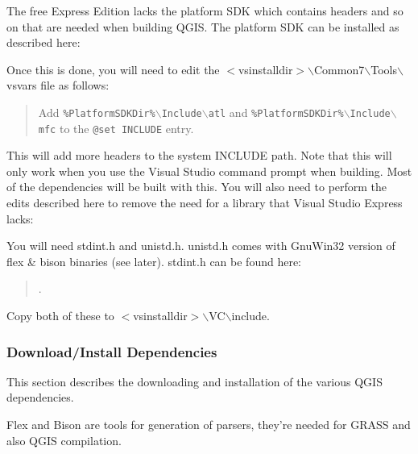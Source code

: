 The free Express Edition lacks the platform SDK which contains headers and so on that are needed when building QGIS. The platform SDK can be installed as described here:

	\begin{quotation}
	\end{quotation}
Once this is done, you will need to edit the $<$vsinstalldir$>$$\backslash$Common7$\backslash$Tools$\backslash$vsvars file as follows:

	\begin{quotation}
Add \texttt{\%PlatformSDKDir\%$\backslash$Include$\backslash$atl} and \texttt{\%PlatformSDKDir\%$\backslash$Include$\backslash$mfc} to the \texttt{@set INCLUDE} entry.
	\end{quotation}
This will add more headers to the system INCLUDE path. Note that this will only work when you use the Visual Studio command prompt when building. Most of the dependencies will be built with this.
You will also need to perform the edits described here to remove the need for a library that Visual Studio Express lacks:

	\begin{quotation}
	\end{quotation}

You will need stdint.h and unistd.h. unistd.h comes with GnuWin32 version of flex \& bison binaries (see later). stdint.h can be found here:

	\begin{quotation}
.
	\end{quotation}
Copy both of these to $<$vsinstalldir$>$$\backslash$VC$\backslash$include.

\subsubsection{Download/Install Dependencies}
This section describes the downloading and installation of the various QGIS dependencies.

Flex and Bison are tools for generation of parsers, they're needed for GRASS and also QGIS compilation.

